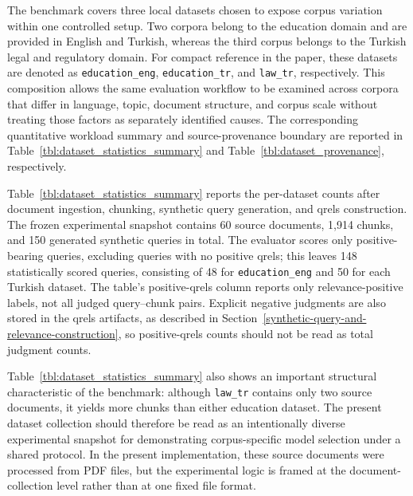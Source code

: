 The benchmark covers three local datasets chosen to expose corpus variation within one controlled setup. Two corpora belong to the education domain and are provided in English and Turkish, whereas the third corpus belongs to the Turkish legal and regulatory domain. For compact reference in the paper, these datasets are denoted as \texttt{education\_eng}, \texttt{education\_tr}, and \texttt{law\_tr}, respectively. This composition allows the same evaluation workflow to be examined across corpora that differ in language, topic, document structure, and corpus scale without treating those factors as separately identified causes. The corresponding quantitative workload summary and source-provenance boundary are reported in Table~\ref{tbl:dataset_statistics_summary} and Table~\ref{tbl:dataset_provenance}, respectively.

Table~\ref{tbl:dataset_statistics_summary} reports the per-dataset counts after document ingestion, chunking, synthetic query generation, and qrels construction. The frozen experimental snapshot contains 60 source documents, 1{,}914 chunks, and 150 generated synthetic queries in total. The evaluator scores only positive-bearing queries, excluding queries with no positive qrels; this leaves 148 statistically scored queries, consisting of 48 for \texttt{education\_eng} and 50 for each Turkish dataset. The table's positive-qrels column reports only relevance-positive labels, not all judged query--chunk pairs. Explicit negative judgments are also stored in the qrels artifacts, as described in Section~\ref{synthetic-query-and-relevance-construction}, so positive-qrels counts should not be read as total judgment counts.

Table~\ref{tbl:dataset_statistics_summary} also shows an important structural characteristic of the benchmark: although \texttt{law\_tr} contains only two source documents, it yields more chunks than either education dataset. The present dataset collection should therefore be read as an intentionally diverse experimental snapshot for demonstrating corpus-specific model selection under a shared protocol. In the present implementation, these source documents were processed from PDF files, but the experimental logic is framed at the document-collection level rather than at one fixed file format.

\begin{table}[htbp]
\caption{Dataset statistics summary for the frozen experimental snapshot. \emph{Judged pairs} counts every query--chunk pair drawn from the roster-wide candidate pool and submitted to the LLM judge; the positive qrels are the subset of those pairs labeled relevant, and the remainder are stored as explicit negative labels.}\label{tbl:dataset_statistics_summary}
\centering
\small

\end{table}

